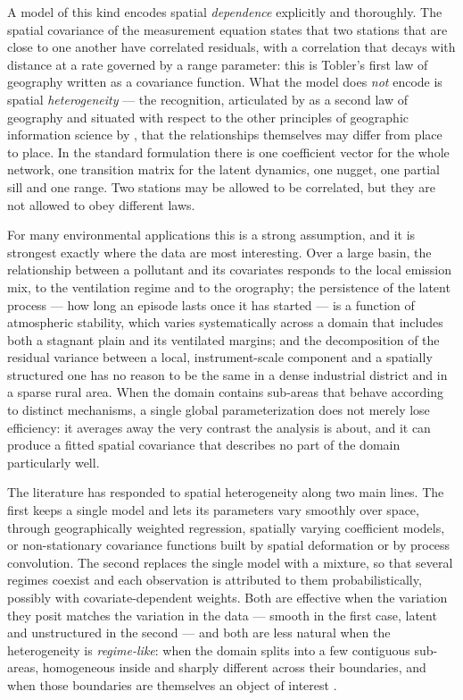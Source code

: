 A model of this kind encodes spatial \emph{dependence} explicitly and thoroughly. The spatial covariance of the measurement equation states that two stations that are close to one another have correlated residuals, with a correlation that decays with distance at a rate governed by a range parameter: this is Tobler's first law of geography \citep{Tobler1970} written as a covariance function. What the model does \emph{not} encode is spatial \emph{heterogeneity} --- the recognition, articulated by \citet{Goodchild2004} as a second law of geography and situated with respect to the other principles of geographic information science by \citet{ZhuTurner2022}, that the relationships themselves may differ from place to place. In the standard formulation there is one coefficient vector for the whole network, one transition matrix for the latent dynamics, one nugget, one partial sill and one range. Two stations may be allowed to be correlated, but they are not allowed to obey different laws.

For many environmental applications this is a strong assumption, and it is strongest exactly where the data are most interesting. Over a large basin, the relationship between a pollutant and its covariates responds to the local emission mix, to the ventilation regime and to the orography; the persistence of the latent process --- how long an episode lasts once it has started --- is a function of atmospheric stability, which varies systematically across a domain that includes both a stagnant plain and its ventilated margins; and the decomposition of the residual variance between a local, instrument-scale component and a spatially structured one has no reason to be the same in a dense industrial district and in a sparse rural area. When the domain contains sub-areas that behave according to distinct mechanisms, a single global parameterization does not merely lose efficiency: it averages away the very contrast the analysis is about, and it can produce a fitted spatial covariance that describes no part of the domain particularly well.

The literature has responded to spatial heterogeneity along two main lines. The first keeps a single model and lets its parameters vary smoothly over space, through geographically weighted regression, spatially varying coefficient models, or non-stationary covariance functions built by spatial deformation or by process convolution. The second replaces the single model with a mixture, so that several regimes coexist and each observation is attributed to them probabilistically, possibly with covariate-dependent weights. Both are effective when the variation they posit matches the variation in the data --- smooth in the first case, latent and unstructured in the second --- and both are less natural when the heterogeneity is \emph{regime-like}: when the domain splits into a few contiguous sub-areas, homogeneous inside and sharply different across their boundaries, and when those boundaries are themselves an object of interest \citep[e.g.][]{anselin2024endogenous,otto2016detection}.

